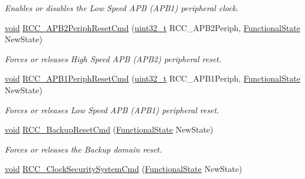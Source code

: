 \begin{DoxyCompactItemize}
\begin{DoxyCompactList}\small\item\em Enables or disables the Low Speed A\+PB (A\+P\+B1) peripheral clock. \end{DoxyCompactList}\item 
\hyperlink{usb__devapi_8h_afabf60e7f57651d6d595a02c75f07cd0}{void} \hyperlink{group___r_c_c___exported___functions_gad94553850ac07106a27ee85fec37efdf}{R\+C\+C\+\_\+\+A\+P\+B2\+Periph\+Reset\+Cmd} (\hyperlink{_p_e___types_8h_a33594304e786b158f3fb30289278f5af}{uint32\+\_\+t} R\+C\+C\+\_\+\+A\+P\+B2\+Periph, \hyperlink{agilefox_2library_2inc_2stm32f10x__type_8h_ac9a7e9a35d2513ec15c3b537aaa4fba1}{Functional\+State} New\+State)
\begin{DoxyCompactList}\small\item\em Forces or releases High Speed A\+PB (A\+P\+B2) peripheral reset. \end{DoxyCompactList}\item 
\hyperlink{usb__devapi_8h_afabf60e7f57651d6d595a02c75f07cd0}{void} \hyperlink{group___r_c_c___exported___functions_gab197ae4369c10b92640a733b40ed2801}{R\+C\+C\+\_\+\+A\+P\+B1\+Periph\+Reset\+Cmd} (\hyperlink{_p_e___types_8h_a33594304e786b158f3fb30289278f5af}{uint32\+\_\+t} R\+C\+C\+\_\+\+A\+P\+B1\+Periph, \hyperlink{agilefox_2library_2inc_2stm32f10x__type_8h_ac9a7e9a35d2513ec15c3b537aaa4fba1}{Functional\+State} New\+State)
\begin{DoxyCompactList}\small\item\em Forces or releases Low Speed A\+PB (A\+P\+B1) peripheral reset. \end{DoxyCompactList}\item 
\hyperlink{usb__devapi_8h_afabf60e7f57651d6d595a02c75f07cd0}{void} \hyperlink{group___r_c_c___exported___functions_ga636c3b72f35391e67f12a551b15fa54a}{R\+C\+C\+\_\+\+Backup\+Reset\+Cmd} (\hyperlink{agilefox_2library_2inc_2stm32f10x__type_8h_ac9a7e9a35d2513ec15c3b537aaa4fba1}{Functional\+State} New\+State)
\begin{DoxyCompactList}\small\item\em Forces or releases the Backup domain reset. \end{DoxyCompactList}\item 
\hyperlink{usb__devapi_8h_afabf60e7f57651d6d595a02c75f07cd0}{void} \hyperlink{group___r_c_c___exported___functions_ga0ff1fd7b9a8a49cdda11b7d7261c3494}{R\+C\+C\+\_\+\+Clock\+Security\+System\+Cmd} (\hyperlink{agilefox_2library_2inc_2stm32f10x__type_8h_ac9a7e9a35d2513ec15c3b537aaa4fba1}{Functional\+State} New\+State)

\end{DoxyCompactItemize}
